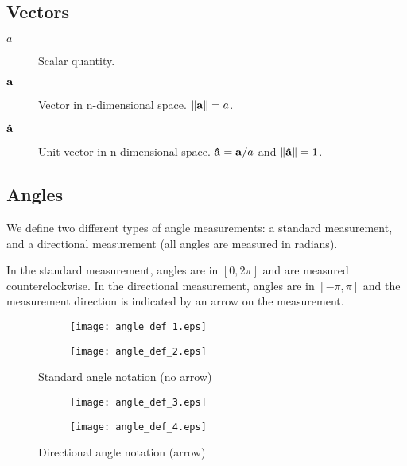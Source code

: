 \subsection{Vectors}

\begin{description}
  \item[$a$] Scalar quantity.
  \item[$\mathbf{a}$] Vector in n-dimensional space. $\norm{\bvec{a}} = a$.
  \item[$\mathbf{\hat{a}}$] Unit vector in n-dimensional space. $\mathbf{\hat{a}} = \mathbf{a}/a$ and $\norm{\bhat{a}} = 1$.
\end{description}

\subsection{Angles}

We define two different types of angle measurements: a standard measurement, and a directional measurement (all angles are measured in radians).

In the standard measurement, angles are in $[0, 2\pi]$ and are measured counterclockwise. In the directional measurement, angles are in $[-\pi, \pi]$ and the measurement direction is indicated by an arrow on the measurement.

\begin{figure}[H]
  \centering
  \begin{subfigure}[b]{0.4\textwidth}
    \texttt{[image: angle\_def\_1.eps]}
    \caption{}
    \label{fig:angle-def-1}
  \end{subfigure}
  \qquad \qquad
  \begin{subfigure}[b]{0.4\textwidth}
    \texttt{[image: angle\_def\_2.eps]}
    \caption{}
    \label{fig:angle-def-2}
  \end{subfigure}
  \caption{Standard angle notation (no arrow)}
\end{figure}

\begin{figure}[H]
  \begin{subfigure}[b]{0.4\textwidth}
    \texttt{[image: angle\_def\_3.eps]}
    \caption{}
    \label{fig:angle-def-3}
  \end{subfigure}
  \qquad \qquad
  \begin{subfigure}[b]{0.4\textwidth}
    \texttt{[image: angle\_def\_4.eps]}
    \caption{}
    \label{fig:angle-def-4}
  \end{subfigure}
  \caption{Directional angle notation (arrow)}
\end{figure}